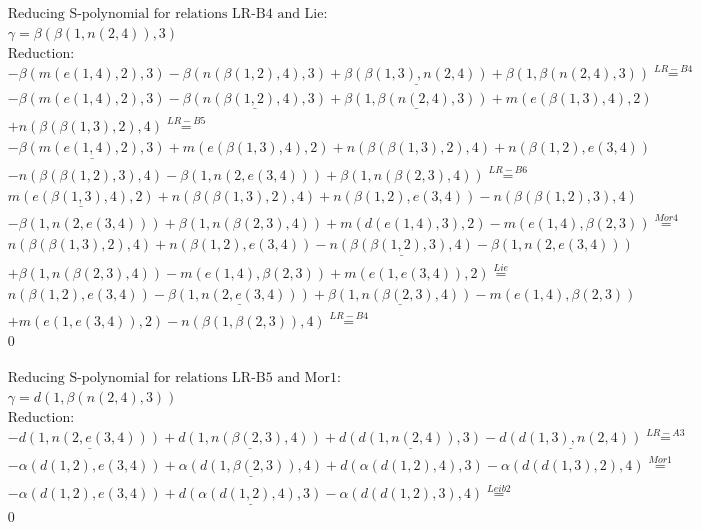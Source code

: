 \documentclass[11pt]{amsart}
\begin{document}
\begin{align*} 
& \text{Reducing S-polynomial for relations LR-B4 and Lie:} \\ 
& \gamma = \beta(\beta(1,n(2,4)),3) \\ 
& \text{Reduction}: \\& - \beta(m(e(1,4),2),3) - \beta(n(\beta(1,2),4),3) + \underline{\beta(\beta(1,3),n(2,4))} + \beta(1,\beta(n(2,4),3)) \stackrel{ LR-B4 }{=}  \\ 
& - \beta(m(e(1,4),2),3) - \underline{\beta(n(\beta(1,2),4),3)} + \underline{\beta(1,\beta(n(2,4),3))} + m(e(\beta(1,3),4),2)\\ 
 &  + n(\beta(\beta(1,3),2),4) \stackrel{ LR-B5 }{=}  \\ 
& - \underline{\beta(m(e(1,4),2),3)} + m(e(\beta(1,3),4),2) + n(\beta(\beta(1,3),2),4) + n(\beta(1,2),e(3,4))\\ 
 &  - n(\beta(\beta(1,2),3),4) - \beta(1,n(2,e(3,4))) + \beta(1,n(\beta(2,3),4)) \stackrel{ LR-B6 }{=}  \\ 
&\underline{m(e(\beta(1,3),4),2)} + n(\beta(\beta(1,3),2),4) + n(\beta(1,2),e(3,4)) - n(\beta(\beta(1,2),3),4)\\ 
 &  - \beta(1,n(2,e(3,4))) + \beta(1,n(\beta(2,3),4)) + m(d(e(1,4),3),2) - m(e(1,4),\beta(2,3)) \stackrel{ Mor4 }{=}  \\ 
&n(\beta(\beta(1,3),2),4) + n(\beta(1,2),e(3,4)) - \underline{n(\beta(\beta(1,2),3),4)} - \beta(1,n(2,e(3,4)))\\ 
 &  + \beta(1,n(\beta(2,3),4)) - m(e(1,4),\beta(2,3)) + m(e(1,e(3,4)),2) \stackrel{ Lie }{=}  \\ 
&n(\beta(1,2),e(3,4)) - \underline{\beta(1,n(2,e(3,4)))} + \underline{\beta(1,n(\beta(2,3),4))} - m(e(1,4),\beta(2,3))\\ 
 &  + m(e(1,e(3,4)),2) - n(\beta(1,\beta(2,3)),4) \stackrel{ LR-B4 }{=}  \\ 
&0\\ 
\end{align*} 
 
\begin{align*} 
& \text{Reducing S-polynomial for relations LR-B5 and Mor1:} \\ 
& \gamma = d(1,\beta(n(2,4),3)) \\ 
& \text{Reduction}: \\& - \underline{d(1,n(2,e(3,4)))} + \underline{d(1,n(\beta(2,3),4))} + \underline{d(d(1,n(2,4)),3)} - \underline{d(d(1,3),n(2,4))} \stackrel{ LR-A3 }{=}  \\ 
& - \alpha(d(1,2),e(3,4)) + \underline{\alpha(d(1,\beta(2,3)),4)} + d(\alpha(d(1,2),4),3) - \alpha(d(d(1,3),2),4) \stackrel{ Mor1 }{=}  \\ 
& - \alpha(d(1,2),e(3,4)) + \underline{d(\alpha(d(1,2),4),3)} - \alpha(d(d(1,2),3),4) \stackrel{ Leib2 }{=}  \\ 
&0\\ 
\end{align*} 
 
\end{document}
